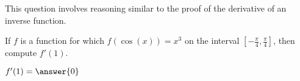 \documentclass{ximera}
\author{Steven Gubkin}
\begin{document}
\begin{exercise}



This question involves reasoning similar to the proof of the
derivative of an inverse function.

If $f$ is a function for which $f(\cos(x)) = x^3$ on the interval
$[-\frac{\pi}{4},\frac{\pi}{4}]$, then compute $f'(1)$.
\begin{prompt}
$f'(1) = \answer{0}$
\end{prompt}
\end{exercise}
\end{document}
